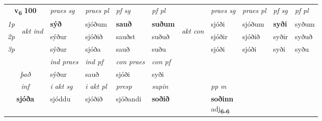 \noindent
\begin{tabular}{lllllllllll} \toprule
\multicolumn{2}{c}{\textbf{v{\textsubscript{6}}} \Large{\textbf{100}}}  &  \textit{praes sg}  & \textit{praes pl}  &\textit{ pf sg} & \textit{pf pl} &  &  \textit{praes sg}  & \textit{praes pl}  & \textit{pf sg} & \textit{pf pl } \\*
	\cmidrule{3-6} \cmidrule{8-11}
 {\textit{1p}} & \multirow{3}{*}{\begin{turn}{90}\textit{akt ind}\end{turn}} & \textbf{sýð} & sjóðum & \textbf{sauð} & \textbf{suðum} & \multirow{3}{*}{\begin{turn}{90}\textit{akt con}\end{turn}} &sjóði & sjóðum & \textbf{syði} & syðum\\*
 {\textit{2p}} &  &  sýður  & sjóðið & sauðst & suðuð & & sjóðir & sjóðið & syðir & syðuð \\*
{\textit{3p}} &  & sýður & sjóða & sauð & suðu & & sjóði & sjóði& syði & syðu \\*
\cmidrule{3-6} \cmidrule{8-11}

   & &  \textit{ind praes} & \textit{ind pf} & \textit{con praes} & \textit{con pf} \\*
\multicolumn{2}{c}{ \textit{það} } & sýður & sauð & sjóði & syði \\*

\cmidrule{3-8}
   \multicolumn{2}{c}{\textit{inf}}  & \textit{i akt sg} & \textit{i akt pl}   & \textit{presp} & \textit{supin}  && \textit{pp m} \\*
  \multicolumn{2}{c}{\textbf{sjóða}} & sjóddu  & sjóðið   & sjóðandi &  \textbf{soðið}  && \specialcell{\textbf{soðinn} \\ adj\textbf{\textsubscript{6-6}}} \\*
\end{tabular}

